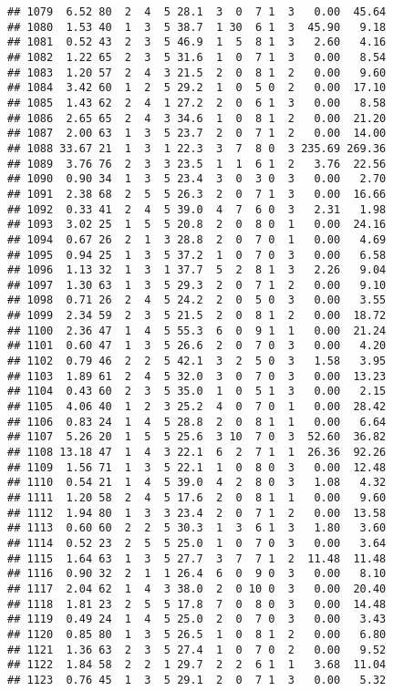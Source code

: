 \documentclass[
]{article}
\begin{document}
\begin{verbatim}
## 1079  6.52 80  2  4  5 28.1  3  0  7 1  3   0.00  45.64
## 1080  1.53 40  1  3  5 38.7  1 30  6 1  3  45.90   9.18
## 1081  0.52 43  2  3  5 46.9  1  5  8 1  3   2.60   4.16
## 1082  1.22 65  2  3  5 31.6  1  0  7 1  3   0.00   8.54
## 1083  1.20 57  2  4  3 21.5  2  0  8 1  2   0.00   9.60
## 1084  3.42 60  1  2  5 29.2  1  0  5 0  2   0.00  17.10
## 1085  1.43 62  2  4  1 27.2  2  0  6 1  3   0.00   8.58
## 1086  2.65 65  2  4  3 34.6  1  0  8 1  2   0.00  21.20
## 1087  2.00 63  1  3  5 23.7  2  0  7 1  2   0.00  14.00
## 1088 33.67 21  1  3  1 22.3  3  7  8 0  3 235.69 269.36
## 1089  3.76 76  2  3  3 23.5  1  1  6 1  2   3.76  22.56
## 1090  0.90 34  1  3  5 23.4  3  0  3 0  3   0.00   2.70
## 1091  2.38 68  2  5  5 26.3  2  0  7 1  3   0.00  16.66
## 1092  0.33 41  2  4  5 39.0  4  7  6 0  3   2.31   1.98
## 1093  3.02 25  1  5  5 20.8  2  0  8 0  1   0.00  24.16
## 1094  0.67 26  2  1  3 28.8  2  0  7 0  1   0.00   4.69
## 1095  0.94 25  1  3  5 37.2  1  0  7 0  3   0.00   6.58
## 1096  1.13 32  1  3  1 37.7  5  2  8 1  3   2.26   9.04
## 1097  1.30 63  1  3  5 29.3  2  0  7 1  2   0.00   9.10
## 1098  0.71 26  2  4  5 24.2  2  0  5 0  3   0.00   3.55
## 1099  2.34 59  2  3  5 21.5  2  0  8 1  2   0.00  18.72
## 1100  2.36 47  1  4  5 55.3  6  0  9 1  1   0.00  21.24
## 1101  0.60 47  1  3  5 26.6  2  0  7 0  3   0.00   4.20
## 1102  0.79 46  2  2  5 42.1  3  2  5 0  3   1.58   3.95
## 1103  1.89 61  2  4  5 32.0  3  0  7 0  3   0.00  13.23
## 1104  0.43 60  2  3  5 35.0  1  0  5 1  3   0.00   2.15
## 1105  4.06 40  1  2  3 25.2  4  0  7 0  1   0.00  28.42
## 1106  0.83 24  1  4  5 28.8  2  0  8 1  1   0.00   6.64
## 1107  5.26 20  1  5  5 25.6  3 10  7 0  3  52.60  36.82
## 1108 13.18 47  1  4  3 22.1  6  2  7 1  1  26.36  92.26
## 1109  1.56 71  1  3  5 22.1  1  0  8 0  3   0.00  12.48
## 1110  0.54 21  1  4  5 39.0  4  2  8 0  3   1.08   4.32
## 1111  1.20 58  2  4  5 17.6  2  0  8 1  1   0.00   9.60
## 1112  1.94 80  1  3  3 23.4  2  0  7 1  2   0.00  13.58
## 1113  0.60 60  2  2  5 30.3  1  3  6 1  3   1.80   3.60
## 1114  0.52 23  2  5  5 25.0  1  0  7 0  3   0.00   3.64
## 1115  1.64 63  1  3  5 27.7  3  7  7 1  2  11.48  11.48
## 1116  0.90 32  2  1  1 26.4  6  0  9 0  3   0.00   8.10
## 1117  2.04 62  1  4  3 38.0  2  0 10 0  3   0.00  20.40
## 1118  1.81 23  2  5  5 17.8  7  0  8 0  3   0.00  14.48
## 1119  0.49 24  1  4  5 25.0  2  0  7 0  3   0.00   3.43
## 1120  0.85 80  1  3  5 26.5  1  0  8 1  2   0.00   6.80
## 1121  1.36 63  2  3  5 27.4  1  0  7 0  2   0.00   9.52
## 1122  1.84 58  2  2  1 29.7  2  2  6 1  1   3.68  11.04
## 1123  0.76 45  1  3  5 29.1  2  0  7 1  3   0.00   5.32

\end{verbatim}
\end{document}
